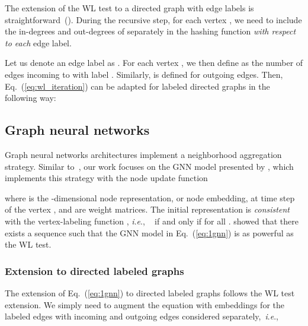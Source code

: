\documentclass{article} \usepackage{iclr2019_conference,times}
\newcommand{\ie}{\textit{i}.\textit{e}., }
\begin{document}
The extension of the WL test to a directed graph with edge labels is straightforward~(\cite{Grohe2017a, Orsini2015}). During the recursive step, for each vertex , we need to include  the in-degrees and  out-degrees of  separately in the hashing function \emph{with respect to each} edge label.

Let us denote an edge label as . For each vertex , we then define  as the number of edges incoming to  with label . Similarly,  is defined for outgoing edges. Then,  Eq.~(\ref{eq:wl_iteration}) can be adapted for labeled directed graphs in the following way:



\subsection{Graph neural networks}

Graph neural networks architectures implement a neighborhood aggregation strategy. Similar to~\cite{Morris2018}, our work focuses on the GNN model presented by \cite{Hamilton2017}, which implements this strategy with the node update function 


where  is the -dimensional node representation, or node embedding, at time step  of the vertex , and  are weight matrices. The initial representation  is \emph{consistent} with the vertex-labeling function , \ie~ if and only if  for all . \cite{Morris2018} showed that there exists a sequence  such that the GNN model in Eq.~(\ref{eq:1gnn}) is as powerful as the WL test.


\subsubsection{Extension to directed labeled graphs}

The extension of Eq.~(\ref{eq:1gnn}) to directed labeled graphs follows the WL test extension. We simply need to augment the equation with embeddings for the labeled edges with incoming and outgoing edges considered separately,~\ie
\end{document}
